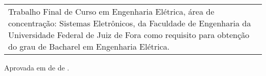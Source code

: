 \thispagestyle{empty}

\begin{center}

\Autor

\vfill

\TITULO

\vfill

\end{center}

\begin{flushright}
    \begin{tabular}{p{8.0cm}}
    Trabalho Final de Curso em Engenharia El\'{e}trica, \'{a}rea de concentra\c{c}\~{a}o: Sistemas Eletr\^{o}nicos, da Faculdade de Engenharia da Universidade Federal de Juiz de Fora como requisito para obten\c{c}\~{a}o do grau de Bacharel em Engenharia Elétrica.
    \end{tabular}
\end{flushright}

\vspace{1.0cm}

\noindent Aprovada em \Dia de \Mes de \Ano.\\


